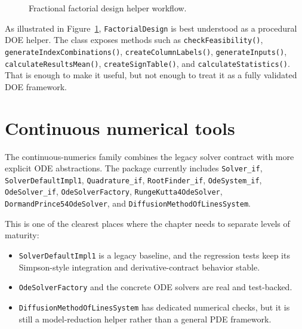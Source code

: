 \begin{figure}[htbp]
\centering
{}
\caption{Fractional factorial design helper workflow.}
\label{fig:tools-doe-workflow}
\end{figure}

As illustrated in Figure~\ref{fig:tools-doe-workflow}, \texttt{FactorialDesign} is best understood as a procedural DOE helper. The class exposes methods such as \texttt{checkFeasibility()}, \texttt{generateIndexCombinations()}, \texttt{createColumnLabels()}, \texttt{generateInputs()}, \texttt{calculateResultsMean()}, \texttt{createSignTable()}, and \texttt{calculateStatistics()}. That is enough to make it useful, but not enough to treat it as a fully validated DOE framework.

\section{Continuous numerical tools}
\label{sec:tools-continuous-numerics}

The continuous-numerics family combines the legacy solver contract with more explicit ODE abstractions. The package currently includes \texttt{Solver\_if}, \texttt{SolverDefaultImpl1}, \texttt{Quadrature\_if}, \texttt{RootFinder\_if}, \texttt{OdeSystem\_if}, \texttt{OdeSolver\_if}, \texttt{OdeSolverFactory}, \texttt{RungeKutta4OdeSolver}, \texttt{DormandPrince54OdeSolver}, and \texttt{DiffusionMethodOfLinesSystem}.

This is one of the clearest places where the chapter needs to separate levels of maturity:
\begin{itemize}
\item \texttt{SolverDefaultImpl1} is a legacy baseline, and the regression tests keep its Simpson-style integration and derivative-contract behavior stable.
\item \texttt{OdeSolverFactory} and the concrete ODE solvers are real and test-backed.
\item \texttt{DiffusionMethodOfLinesSystem} has dedicated numerical checks, but it is still a model-reduction helper rather than a general PDE framework.
\end{itemize}

